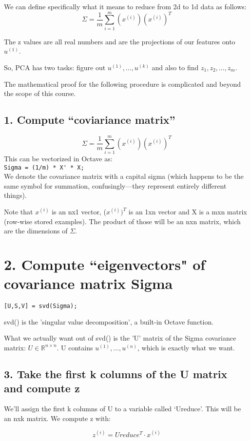 We can define specifically what it means to reduce from 2d to 1d data as follows:
$$ \Sigma = \dfrac{1}{m}\sum^m_{i=1}(x^{(i)})(x^{(i)})^T $$

The z values are all real numbers and are the projections of our features onto $u^{(1)}$.

So, PCA has two tasks: figure out $u^{(1)},\dots,u^{(k)}$ and also to find $z_1, z_2, \dots, z_m$.

The mathematical proof for the following procedure is complicated and beyond the scope of this course.
\subsection{1. Compute ``coviariance matrix''}
\begin{equation}
\Sigma = \dfrac{1}{m}\sum^m_{i=1}(x^{(i)})(x^{(i)})^T
\end{equation}
This can be vectorized in Octave as: \\
\verb|Sigma = (1/m) * X' * X;| \\

We denote the covariance matrix with a capital sigma (which happens to be the same symbol for summation, confusingly---they represent entirely different things).

Note that $x^{(i)}$ is an nx1 vector, ($x^{(i)})^T$ is an 1xn vector and X is a mxn matrix (row-wise stored examples). The product of those will be an nxn matrix, which are the dimensions of $\Sigma$.

\section{2. Compute ``eigenvectors" of covariance matrix Sigma}
\verb|[U,S,V] = svd(Sigma);|

svd() is the 'singular value decomposition', a built-in Octave function.

What we actually want out of svd() is the 'U' matrix of the Sigma covariance matrix: $U \in \mathbb{R}^{n \times n} $. U contains $u^{(1)},\dots,u^{(n)}$, which is exactly what we want.

\subsection{3. Take the first k columns of the U matrix and compute z}
We'll assign the first k columns of U to a variable called `Ureduce'. This will be an nxk matrix. We compute z with:

$$z^{(i)} = Ureduce^T \cdot x^{(i)}$$

